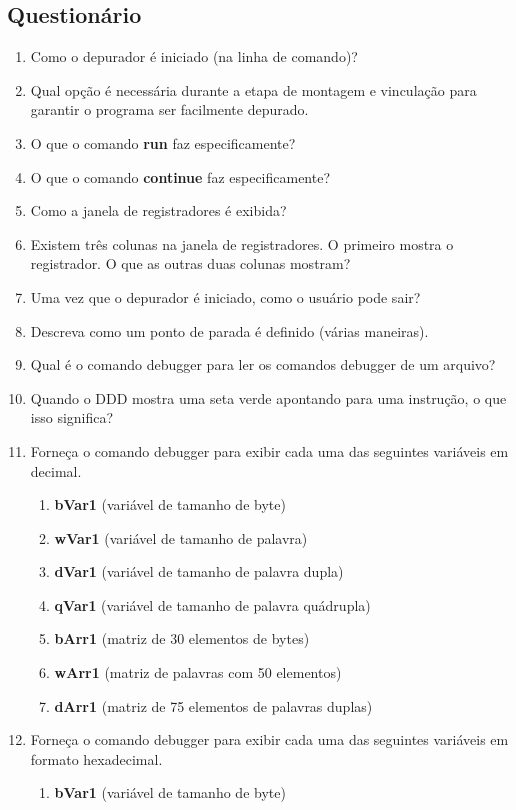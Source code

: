 \subsection{Questionário}
\begin{enumerate}
	\item Como o depurador é iniciado (na linha de comando)?
	\item Qual opção é necessária durante a etapa de montagem e vinculação para garantir o	programa ser facilmente depurado.
	\item O que o comando \textbf{run} faz especificamente?
	\item O que o comando \textbf{continue} faz especificamente?
	\item Como a janela de registradores é exibida?
	\item Existem três colunas na janela de registradores. O primeiro mostra o registrador.	O que as outras duas colunas mostram?
	\item Uma vez que o depurador é iniciado, como o usuário pode sair?
	\item Descreva como um ponto de parada é definido (várias maneiras).
	\item Qual é o comando debugger para ler os comandos debugger de um arquivo?
	\item Quando o DDD mostra uma seta verde apontando para uma instrução, o que isso significa?
	\item Forneça o comando debugger para exibir cada uma das seguintes variáveis em decimal.
	\begin{enumerate}
		\item \textbf{bVar1} (variável de tamanho de byte)
		\item \textbf{wVar1} (variável de tamanho de palavra)
		\item \textbf{dVar1} (variável de tamanho de palavra dupla)
		\item \textbf{qVar1} (variável de tamanho de palavra quádrupla)
		\item \textbf{bArr1} (matriz de 30 elementos de bytes)
		\item \textbf{wArr1} (matriz de palavras com 50 elementos)
		\item \textbf{dArr1} (matriz de 75 elementos de palavras duplas)
	\end{enumerate}
    \item Forneça o comando debugger para exibir cada uma das seguintes variáveis em formato hexadecimal.
    \begin{enumerate}
    	\item \textbf{bVar1} (variável de tamanho de byte)

\end{enumerate}
\end{enumerate}
